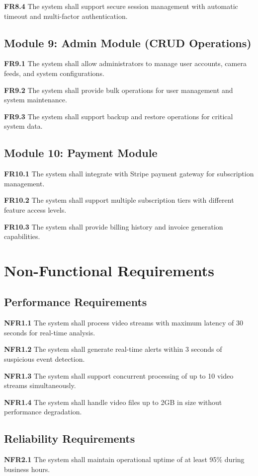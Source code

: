 \documentclass[12pt,a4paper]{article}
\begin{document}
\textbf{FR8.4} The system shall support secure session management with automatic timeout and multi-factor authentication.

\subsection{Module 9: Admin Module (CRUD Operations)}
\textbf{FR9.1} The system shall allow administrators to manage user accounts, camera feeds, and system configurations.

\textbf{FR9.2} The system shall provide bulk operations for user management and system maintenance.

\textbf{FR9.3} The system shall support backup and restore operations for critical system data.

\subsection{Module 10: Payment Module}
\textbf{FR10.1} The system shall integrate with Stripe payment gateway for subscription management.

\textbf{FR10.2} The system shall support multiple subscription tiers with different feature access levels.

\textbf{FR10.3} The system shall provide billing history and invoice generation capabilities.

\clearpage

\section{Non-Functional Requirements}

\subsection{Performance Requirements}
\textbf{NFR1.1} The system shall process video streams with maximum latency of 30 seconds for real-time analysis.

\textbf{NFR1.2} The system shall generate real-time alerts within 3 seconds of suspicious event detection.

\textbf{NFR1.3} The system shall support concurrent processing of up to 10 video streams simultaneously.

\textbf{NFR1.4} The system shall handle video files up to 2GB in size without performance degradation.

\subsection{Reliability Requirements}
\textbf{NFR2.1} The system shall maintain operational uptime of at least 95\% during business hours.
\end{document}
